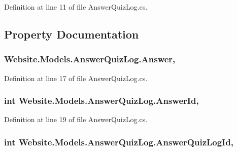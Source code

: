 Definition at line 11 of file Answer\+Quiz\+Log.\+cs.



\subsection{Property Documentation}
\hypertarget{class_website_1_1_models_1_1_answer_quiz_log_a0c1def8b324bd60b6ae98bf8785543fd}{}
\subsubsection[{Answer}]{ Website.\+Models.\+Answer\+Quiz\+Log.\+Answer\hspace{0.3cm}{\ttfamily [get]}, {\ttfamily [set]}}\label{class_website_1_1_models_1_1_answer_quiz_log_a0c1def8b324bd60b6ae98bf8785543fd}


Definition at line 17 of file Answer\+Quiz\+Log.\+cs.

\hypertarget{class_website_1_1_models_1_1_answer_quiz_log_af96a3fe6f6f064cbc98e2a82279aff0a}{}
\subsubsection[{Answer\+Id}]{\setlength{\rightskip}{0pt plus 5cm}int Website.\+Models.\+Answer\+Quiz\+Log.\+Answer\+Id\hspace{0.3cm}{\ttfamily [get]}, {\ttfamily [set]}}\label{class_website_1_1_models_1_1_answer_quiz_log_af96a3fe6f6f064cbc98e2a82279aff0a}


Definition at line 19 of file Answer\+Quiz\+Log.\+cs.

\hypertarget{class_website_1_1_models_1_1_answer_quiz_log_afcc76aedf266b68d199fa0154b962eff}{}
\subsubsection[{Answer\+Quiz\+Log\+Id}]{\setlength{\rightskip}{0pt plus 5cm}int Website.\+Models.\+Answer\+Quiz\+Log.\+Answer\+Quiz\+Log\+Id\hspace{0.3cm}{\ttfamily [get]}, {\ttfamily [set]}}\label{class_website_1_1_models_1_1_answer_quiz_log_afcc76aedf266b68d199fa0154b962eff}


